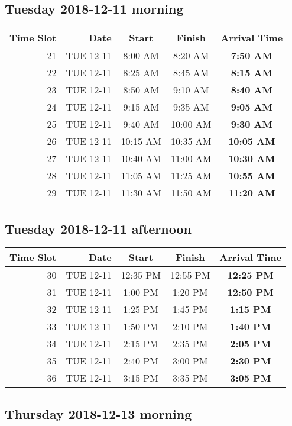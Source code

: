 \documentclass[]{book}
\theoremstyle{definition}
\theoremstyle{definition}
\theoremstyle{definition}
\theoremstyle{remark}
\begin{document}
\hypertarget{tuesday-2018-12-11-morning}{%
\subsection{Tuesday 2018-12-11
morning}\label{tuesday-2018-12-11-morning}}

\begin{longtable}[]{@{}rrccc@{}}
\toprule
Time Slot & Date & Start & Finish & \textbf{Arrival Time}\tabularnewline
\midrule
\endhead
21 & TUE 12-11 & 8:00 AM & 8:20 AM & \textbf{7:50 AM}\tabularnewline
22 & TUE 12-11 & 8:25 AM & 8:45 AM & \textbf{8:15 AM}\tabularnewline
23 & TUE 12-11 & 8:50 AM & 9:10 AM & \textbf{8:40 AM}\tabularnewline
24 & TUE 12-11 & 9:15 AM & 9:35 AM & \textbf{9:05 AM}\tabularnewline
25 & TUE 12-11 & 9:40 AM & 10:00 AM & \textbf{9:30 AM}\tabularnewline
26 & TUE 12-11 & 10:15 AM & 10:35 AM & \textbf{10:05 AM}\tabularnewline
27 & TUE 12-11 & 10:40 AM & 11:00 AM & \textbf{10:30 AM}\tabularnewline
28 & TUE 12-11 & 11:05 AM & 11:25 AM & \textbf{10:55 AM}\tabularnewline
29 & TUE 12-11 & 11:30 AM & 11:50 AM & \textbf{11:20 AM}\tabularnewline
\bottomrule
\end{longtable}

\hypertarget{tuesday-2018-12-11-afternoon}{%
\subsection{Tuesday 2018-12-11
afternoon}\label{tuesday-2018-12-11-afternoon}}

\begin{longtable}[]{@{}rrccc@{}}
\toprule
Time Slot & Date & Start & Finish & \textbf{Arrival Time}\tabularnewline
\midrule
\endhead
30 & TUE 12-11 & 12:35 PM & 12:55 PM & \textbf{12:25 PM}\tabularnewline
31 & TUE 12-11 & 1:00 PM & 1:20 PM & \textbf{12:50 PM}\tabularnewline
32 & TUE 12-11 & 1:25 PM & 1:45 PM & \textbf{1:15 PM}\tabularnewline
33 & TUE 12-11 & 1:50 PM & 2:10 PM & \textbf{1:40 PM}\tabularnewline
34 & TUE 12-11 & 2:15 PM & 2:35 PM & \textbf{2:05 PM}\tabularnewline
35 & TUE 12-11 & 2:40 PM & 3:00 PM & \textbf{2:30 PM}\tabularnewline
36 & TUE 12-11 & 3:15 PM & 3:35 PM & \textbf{3:05 PM}\tabularnewline
\bottomrule
\end{longtable}

\hypertarget{thursday-2018-12-13-morning}{%
\subsection{Thursday 2018-12-13
morning}\label{thursday-2018-12-13-morning}}
\end{document}
